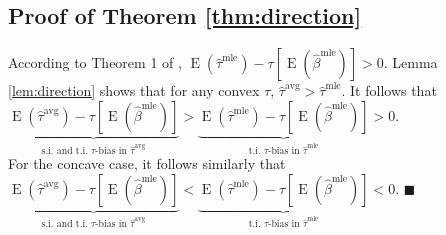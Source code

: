 \documentclass[12pt]{article}
\newenvironment{proof}[1][Proof]{\begin{trivlist}
\item[\hskip \labelsep {\bfseries #1}]}{\end{trivlist}}
\DeclareMathOperator*{\E}{\text{E}}
\begin{document}
\subsection{Proof of Theorem \ref{thm:direction}}

\begin{proof}
According to Theorem 1 of \citet[p.\@ 405]{Rainey2017}, $\E \left( \hat{\tau}^\text{mle}\right) -  \tau \left[\E \left( \hat{\beta}^\text{mle} \right) \right] > 0$.
Lemma \ref{lem:direction} shows that for any convex $\tau$, $\hat{\tau}^{\text{avg}} > \hat{\tau}^\text{mle}$.
It follows that $\underbrace{\E \left( \hat{\tau}^\text{avg}\right) - \tau \left[\E \left( \hat{\beta}^\text{mle} \right) \right]}_{\text{s.i. and t.i. } \tau\text{-bias in }\hat{\tau}^{\text{avg}}} > \underbrace{\E \left( \hat{\tau}^\text{mle}\right) -  \tau \left[\E \left( \hat{\beta}^\text{mle} \right) \right]}_{\text{t.i. } \tau\text{-bias in }\hat{\tau}^{\text{mle}}} > 0$.\\

\noindent For the concave case, it follows similarly that $\underbrace{\E \left( \hat{\tau}^\text{avg}\right) - \tau \left[\E \left( \hat{\beta}^\text{mle} \right) \right]}_{\text{s.i. and t.i. } \tau\text{-bias in }\hat{\tau}^{\text{avg}}} < \underbrace{\E \left( \hat{\tau}^\text{mle}\right) -  \tau \left[\E \left( \hat{\beta}^\text{mle} \right) \right]}_{\text{t.i. } \tau\text{-bias in }\hat{\tau}^{\text{mle}}} < 0$.
 $\blacksquare$
\end{proof}
\end{document}
